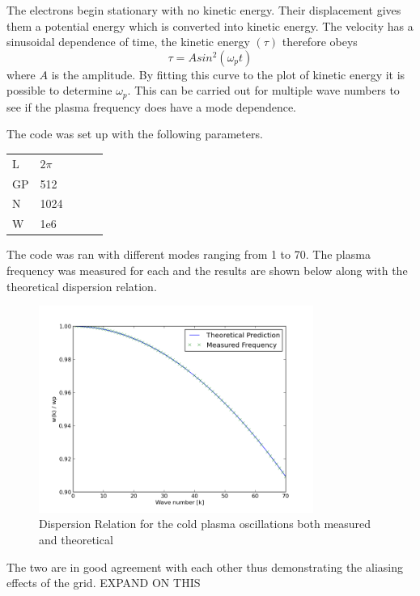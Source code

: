\documentclass[12pt]{article}
\def\be{\begin{equation}}
\def\ee{\end{equation}}
\begin{document}
The electrons begin stationary with no kinetic energy. Their displacement gives them a potential energy which is converted into kinetic energy. The velocity has a sinusoidal dependence of time, the kinetic energy $(\tau)$ therefore obeys 
\be 
\tau = Asin^2(\omega_p t)
\ee
where $A$ is the amplitude. By fitting this curve to the plot of kinetic energy it is possible to determine 
$\omega_p$. This can be carried out for multiple wave numbers to see if the plasma frequency does have a  mode dependence. 

The code was set up with the following parameters. 
\begin{table}[h]
\begin{tabular}{lllll}
L  & ${2\pi}$      \\
GP & 512    \\
N  & 1024   \\
W  & 1e6   
\end{tabular}
\end{table} 
The code was ran with different modes ranging from 1 to 70. The plasma frequency was measured for each and the results are shown below along with the theoretical dispersion relation.
\begin{figure}[H]
\centering
\includegraphics[width=0.8\textwidth]{cold_results.png}
\caption{Dispersion Relation for the cold plasma oscillations both measured and theoretical}
\end{figure}
The two are in good agreement with each other thus demonstrating the aliasing effects of the grid. EXPAND ON THIS 
\end{document}
